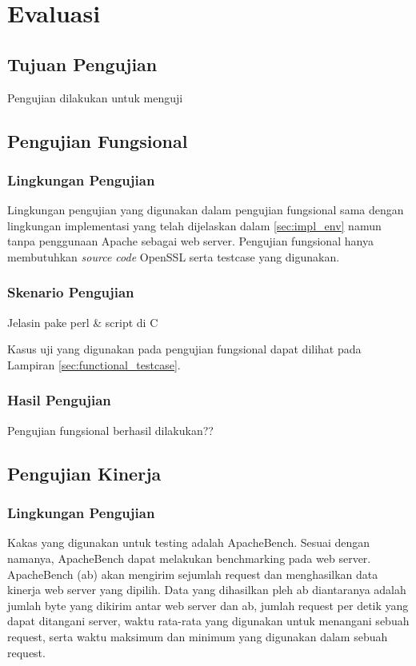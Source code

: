 \section{Evaluasi}
\subsection{Tujuan Pengujian}
Pengujian dilakukan untuk menguji

\subsection{Pengujian Fungsional}

\subsubsection{Lingkungan Pengujian}
Lingkungan pengujian yang digunakan dalam pengujian fungsional sama dengan lingkungan implementasi yang telah dijelaskan dalam \ref{sec:impl_env} namun tanpa penggunaan Apache sebagai web server. Pengujian fungsional hanya membutuhkan \textit{source code} OpenSSL serta testcase yang digunakan.

\subsubsection{Skenario Pengujian}
Jelasin pake perl \& script di C

Kasus uji yang digunakan pada pengujian fungsional dapat dilihat pada Lampiran \ref{sec:functional_testcase}.

\subsubsection{Hasil Pengujian}
Pengujian fungsional berhasil dilakukan??

\subsection{Pengujian Kinerja}

\subsubsection{Lingkungan Pengujian}

Kakas yang digunakan untuk testing adalah ApacheBench. Sesuai dengan namanya, ApacheBench dapat melakukan benchmarking pada web server. ApacheBench (ab) akan mengirim sejumlah request dan menghasilkan data kinerja web server yang dipilih. Data yang dihasilkan pleh ab diantaranya adalah jumlah byte yang dikirim antar web server dan ab, jumlah request per detik yang dapat ditangani server, waktu rata-rata yang digunakan untuk menangani sebuah request, serta waktu maksimum dan minimum yang digunakan dalam sebuah request.


